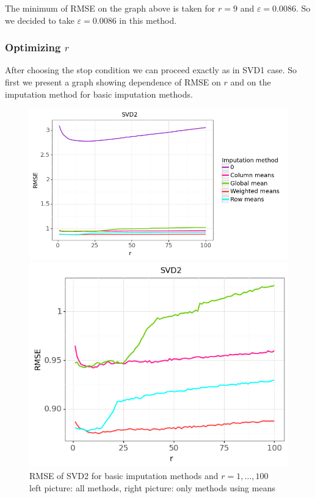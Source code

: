 \documentclass[10pt]{amsart}
\begin{document}
The minimum of RMSE on the graph above is taken for $r=9$ and $\varepsilon = 0.0086$.
So we decided to take $\varepsilon = 0.0086$ in this method.


\subsubsection*{Optimizing $r$}
After choosing the stop condition we can proceed exactly as in SVD1 case.
So first we present a graph showing dependence of RMSE on $r$ and on the imputation method for basic imputation methods.
\begin{figure}[H]
\centering
\begin{minipage}{.63\textwidth}
  \centering
  \includegraphics[width=\textwidth]{svd2_1}
\end{minipage}%
\begin{minipage}{.4\textwidth}
  \centering
  \includegraphics[width=\textwidth]{svd2_2}
\end{minipage}
\caption{RMSE of SVD2 for basic imputation methods and $r = 1, \dots, 100$\\
left picture: all methods, right picture: only methods using means}
\end{figure}
\end{document}
